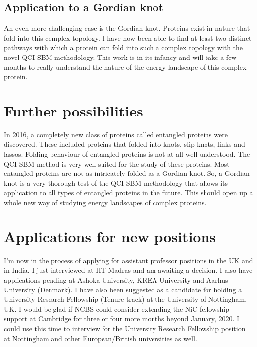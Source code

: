 \documentclass[a4paper,11pt]{article}
\begin{document}
\subsection{Application to a Gordian knot}
An even more challenging case is the Gordian knot. Proteins exist in nature that fold into this complex topology. I have now been able to find at least two distinct pathways with which a protein can fold into such a complex topology with the novel QCI-SBM methodology. This work is in its infancy and will take a few months to really understand the nature of the energy landscape of this complex protein.
\section{Further possibilities}
In 2016, a completely new class of proteins called entangled proteins were discovered. These included proteins that folded into knots, slip-knots, links and lassos. Folding behaviour of entangled proteins is not at all well understood. The QCI-SBM method is very well-suited for the study of these proteins. Most entangled proteins are not as intricately folded as a Gordian knot. So, a Gordian knot is a very thorough test of the QCI-SBM methodology that allows its application to all types of entangled proteins in the future. This should open up a whole new way of studying energy landscapes of complex proteins. 
\section{Applications for new positions}
I'm now in the process of applying for assistant professor positions in the UK and in India. I just interviewed at IIT-Madras and am awaiting a decision. I also have applications pending at Ashoka University, KREA University and Aarhus University (Denmark). I have also been suggested as a candidate for holding a University Research Fellowship (Tenure-track) at the University of Nottingham, UK. I would be glad if NCBS could consider extending the NiC fellowship support at Cambridge for three or four more months beyond January, 2020. I could use this time to interview for the University Research Fellowship position at Nottingham and other European/British universities as well.  


\end{document}

